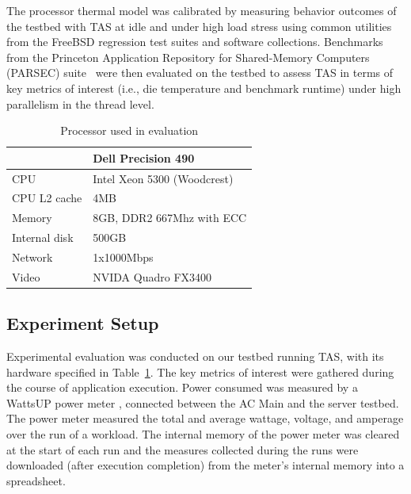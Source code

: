 \documentclass[times, 10pt,twocolumn]{IEEEtran}
\begin{document}
The processor thermal model was calibrated by measuring behavior
outcomes of the testbed with TAS at idle and under high load stress
using common utilities from the FreeBSD regression test suites and
software collections.  Benchmarks from the Princeton Application
Repository for Shared-Memory Computers (PARSEC) suite~\cite{Bienia2011}
were then evaluated on the testbed to assess TAS in terms of key metrics
of interest (i.e., die temperature and benchmark runtime) under
high parallelism in the thread level.

\begin{small}
\begin{table}[tbhp] 
\centering
  \caption{Processor used in evaluation}
  \label{tab:hardware}
  \begin{tabular}{l l} 
\hline 
\hline
&\textbf{Dell Precision 490}\\ 
\hline 
CPU&Intel Xeon 5300 (Woodcrest)\\ 
CPU L2 cache&4MB\\ 
Memory&8GB, DDR2 667Mhz with ECC\\
Internal disk&500GB\\ 
Network&1x1000Mbps\\ 
Video&NVIDA Quadro FX3400\\ 
\hline
  \end{tabular}
\end{table}
\end{small}
\subsection{Experiment Setup}
\label{sec:experiment-setup} 
Experimental evaluation was conducted on our testbed running TAS, with
its hardware specified in Table~\ref{tab:hardware}.  The key metrics of
interest were gathered during the course of application execution.
Power consumed was measured by a WattsUP power meter
\cite{WattsUp2006a}, connected between the AC Main and the server
testbed.  The power meter measured the total and average wattage,
voltage, and amperage over the run of a workload.  The internal memory
of the power meter was cleared at the start of each run and the measures
collected during the runs were downloaded (after execution completion)
from the meter's internal memory into a spreadsheet.
\end{document}
